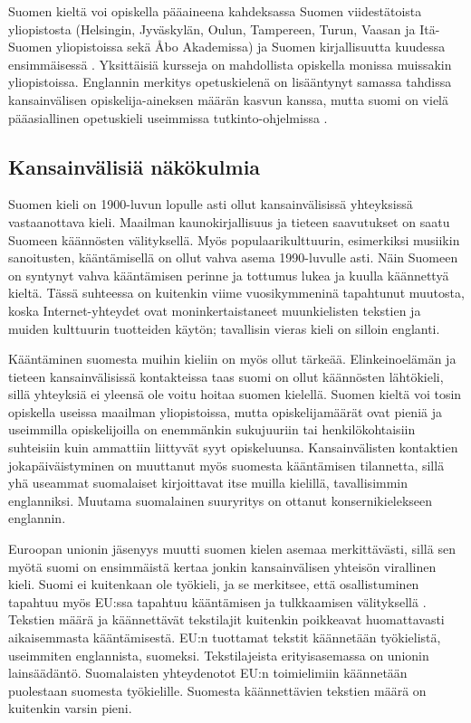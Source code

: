 \begin{multicols}{2}
Suomen kieltä voi opiskella pääaineena kahdeksassa Suomen viidestätoista yliopistosta (Helsingin, Jyväskylän, Oulun, Tampereen, Turun, Vaasan ja Itä-Suomen yliopistoissa sekä Åbo Akademissa) ja Suomen kirjallisuutta kuudessa ensimmäisessä \cite{hum-ulko}. Yksittäisiä kursseja on mahdollista opiskella monissa muissakin yliopistoissa. Englannin merkitys opetuskielenä on lisääntynyt samassa tahdissa kansainvälisen opiskelija-aineksen määrän kasvun kanssa, mutta suomi on vielä pääasiallinen opetuskieli useimmissa tutkinto-ohjelmissa \cite{Board}.

\subsection{Kansainvälisiä näkökulmia}

Suomen kieli on 1900-luvun lopulle asti ollut kansainvälisissä yhteyksissä vastaanottava kieli. Maailman kaunokirjallisuus ja tieteen saavutukset on saatu Suomeen käännösten välityksellä. Myös populaarikulttuurin, esimerkiksi musiikin sanoitusten, kääntämisellä on ollut vahva asema 1990-luvulle asti. Näin Suomeen on syntynyt vahva kääntämisen perinne ja tottumus lukea ja kuulla käännettyä kieltä. Tässä suhteessa on kuitenkin viime vuosikymmeninä tapahtunut muutosta, koska Internet-yhteydet ovat moninkertaistaneet muunkielisten tekstien ja muiden kulttuurin tuotteiden käytön; tavallisin vieras kieli on silloin englanti.  


Kääntäminen suomesta muihin kieliin on myös ollut tärkeää. Elinkeinoelämän ja tieteen kansainvälisissä kontakteissa taas suomi on ollut käännösten lähtökieli, sillä yhteyksiä ei yleensä ole voitu hoitaa suomen kielellä. Suomen kieltä voi tosin opiskella useissa maailman yliopistoissa, mutta opiskelijamäärät ovat pieniä ja useimmilla opiskelijoilla on enemmänkin sukujuuriin tai henkilökohtaisiin suhteisiin kuin ammattiin liittyvät syyt opiskeluunsa. Kansainvälisten kontaktien jokapäiväistyminen on muuttanut myös suomesta kääntämisen tilannetta, sillä yhä useammat suomalaiset kirjoittavat itse muilla kielillä, tavallisimmin englanniksi. Muutama suomalainen suuryritys on ottanut konsernikielekseen englannin.

Euroopan unionin jäsenyys muutti suomen kielen asemaa merkittävästi, sillä sen myötä suomi on ensimmäistä kertaa jonkin kansainvälisen yhteisön virallinen kieli. Suomi ei kuitenkaan ole työkieli, ja se merkitsee, että osallistuminen tapahtuu myös EU:ssa tapahtuu kääntämisen ja tulkkaamisen välityksellä \cite{Tulevaisuus2009}.  Tekstien määrä ja käännettävät tekstilajit kuitenkin poikkeavat huomattavasti aikaisemmasta kääntämisestä. EU:n tuottamat tekstit käännetään työkielistä, useimmiten englannista, suomeksi.  Tekstilajeista erityisasemassa on unionin lainsäädäntö. Suomalaisten yhteydenotot EU:n toimielimiin käännetään puolestaan suomesta työkielille. Suomesta käännettävien tekstien määrä on kuitenkin varsin pieni.


\end{multicols}
